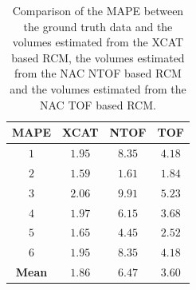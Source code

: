             \begin{table}
                \centering
                
                \captionsetup{singlelinecheck=false, justification=raggedright}
                \caption{Comparison of the \gls{MAPE} between the ground truth data and the volumes estimated from the \gls{XCAT} based \gls{RCM}, the volumes estimated from the \gls{NAC} \gls{NTOF} based \gls{RCM} and the volumes estimated from the \gls{NAC} \gls{TOF} based \gls{RCM}.}
                
                \resizebox*{1.0\linewidth}{!}
                {
                    \begin{tabular}{||c|ccc||}
                        \hline
                        \textbf{\gls{MAPE}} & \textbf{XCAT} & \textbf{\gls{NTOF}} & \textbf{\gls{TOF}} \\
                        \hline
                        \textbf{$1$} & $1.95$ & $8.35$ & $4.18$ \\
                        \textbf{$2$} & $1.59$ & $1.61$ & $1.84$ \\
                        \textbf{$3$} & $2.06$ & $9.91$ & $5.23$ \\
                        \textbf{$4$} & $1.97$ & $6.15$ & $3.68$ \\
                        \textbf{$5$} & $1.65$ & $4.45$ & $2.52$ \\
                        \textbf{$6$} & $1.95$ & $8.35$ & $4.18$ \\
                        \hline
                        \textbf{Mean} & $1.86$ & $6.47$ & $3.60$ \\
                        \hline
                    \end{tabular}
                } \label{tab:impact_of_tof_on_respiratory_motion_modelling_using_nac_pet_results_mape}
            \end{table}
            
